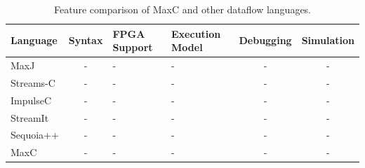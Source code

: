 \begin{table}[!h]
  \renewcommand{\arraystretch}{1.3}
  \centering
  \caption{Feature comparison of MaxC and other dataflow languages.}
  \label{table:feature-comparison}
  \begin{tabular}{ l | c |  p{1cm} |  p{1cm} |  c |  c }
    Language  & Syntax & FPGA Support & Execution Model & Debugging & Simulation \\ \hline
    MaxJ      & -      & -            & -               & -         & -          \\
    Streams-C & -      & -            & -               & -         & -          \\
    ImpulseC  & -      & -            & -               & -         & -          \\
    StreamIt  & -      & -            & -               & -         & -          \\
    Sequoia++ & -      & -            & -               & -         & -          \\
    MaxC      & -      & -            & -               & -         & -          \\
  \end{tabular}
\end{table}


